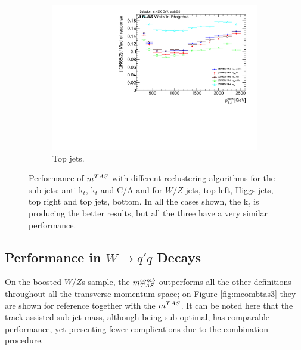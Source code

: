 \begin{figure}
    \begin{subfigure}[b]{0.45\textwidth}
        \centering
   \includegraphics[width=\textwidth]{jet_part/mtas/71graphcftr_h_JetRatio_mJ12CALOTopsCalib.pdf}
    \caption{Top jets.}
    \label{fig:allalgotop}
    \end{subfigure}

\caption{Performance of $m^{TAS}$ with different reclustering algorithms for the sub-jets: anti-k$_t$, k$_t$ and C/A and for $W/Z$ jets, top left, Higgs jets, top right and top jets, bottom. In all the cases shown, the k$_t$ is producing the better results, but all the three have a very similar performance.}
\end{figure}


\subsection{Performance in $W \to q'\bar{q}$ Decays}
On the boosted $W/Z$s sample, the $m^{comb}_{TAS}$ outperforms all the other definitions throughout all the transverse momentum space; on Figure \ref{fig:mcombtas3} they are shown for reference together with the $m^{TAS}$. It can be noted here that the track-assisted sub-jet mass, although being sub-optimal, has comparable performance, yet presenting fewer complications due to the combination procedure.




